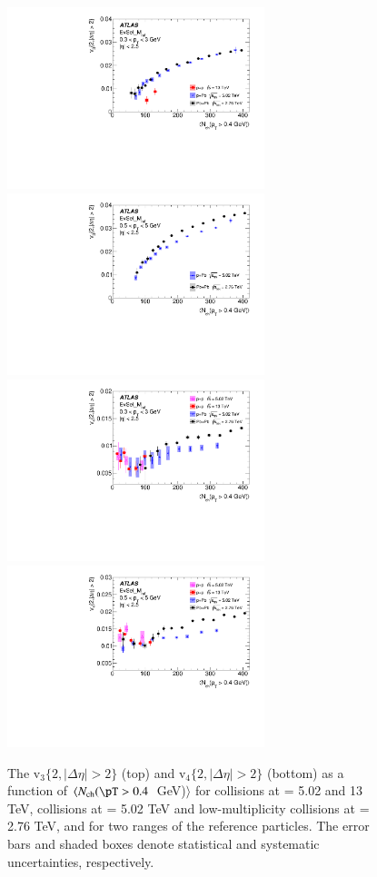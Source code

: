 \documentclass[cernpreprint,texlive=2014,txfonts,UKenglish]{latex/atlasdoc}
\begin{document}
\begin{figure}[H]
\begin{center}
\includegraphics[width=75mm]{fig_13a.pdf}
\includegraphics[width=75mm]{fig_13b.pdf}
\includegraphics[width=75mm]{fig_13c.pdf}
\includegraphics[width=75mm]{fig_13d.pdf}
\caption{The $\mathrm{v}_3\{2,|\Delta\eta|>2\}$ (top) and $\mathrm{v}_4\{2,|\Delta\eta|>2\}$ (bottom) as a function of $\langle N_{\mathrm{ch}}(\pT > 0.4$~GeV)$\rangle$ for \pp collisions at \sqs= 5.02 and 13 TeV, \pPb collisions at \sqn= 5.02 TeV and low-multiplicity \PbPb collisions at \sqn= 2.76 TeV, and for two \pT ranges of the reference particles. The error bars and shaded boxes denote statistical and systematic uncertainties, respectively.}
\label{fig:comp_pPb_PbPb_v34} 
\end{center}
\end{figure} 
\end{document}
